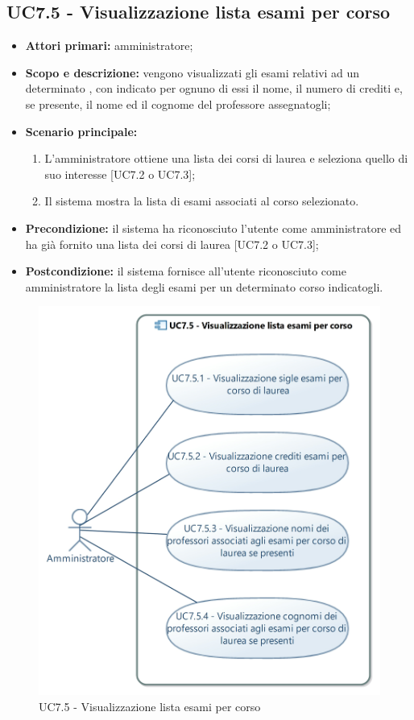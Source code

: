\documentclass[AnalisiDeiRequisiti.tex]{subfiles}
\begin{document}
\subsection{UC7.5 - Visualizzazione lista esami per corso}
\begin{itemize}
	\item \textbf{Attori primari:} amministratore;
	\item \textbf{Scopo e descrizione:} vengono visualizzati gli esami relativi ad un determinato , con indicato per ognuno di essi il nome, il numero di crediti e, se presente, il nome ed il cognome del professore assegnatogli;
	\item \textbf{Scenario principale:}
	\begin{enumerate}
		\item L'amministratore ottiene una lista dei corsi di laurea e seleziona quello di suo interesse [UC7.2 o UC7.3];
		\item Il sistema mostra la lista di esami associati al corso selezionato.
	\end{enumerate}
	\item \textbf{Precondizione:} il sistema ha riconosciuto l'utente come amministratore ed ha già fornito una lista dei corsi di laurea [UC7.2 o UC7.3]; 
	\item \textbf{Postcondizione:} il sistema fornisce all'utente riconosciuto come amministratore la lista degli esami per un determinato corso indicatogli.
\end{itemize}
\begin{figure}[H]
	\centering
	\includegraphics[width=0.8\linewidth]{UC7_5.jpg}
	\caption{UC7.5 - Visualizzazione lista esami per corso}
	\label{fig:UC7.5 - Visualizzazione lista esami per corso}
\end{figure}
\end{document}
